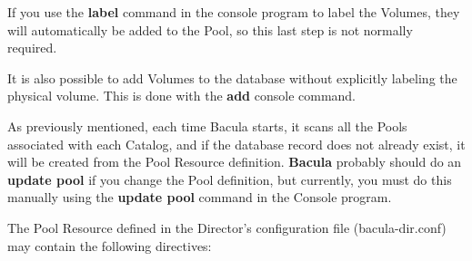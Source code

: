 If you use the {\bf label} command in the console program to label the
Volumes, they will automatically be added to the Pool, so this last step is
not normally required. 

It is also possible to add Volumes to the database without explicitly labeling
the physical volume. This is done with the {\bf add} console command. 

As previously mentioned, each time Bacula starts, it scans all the Pools
associated with each Catalog, and if the database record does not already
exist, it will be created from the Pool Resource definition. {\bf Bacula}
probably should do an {\bf update pool} if you change the Pool definition, but
currently, you must do this manually using the {\bf update pool} command in
the Console program. 

The Pool Resource defined in the Director's configuration file
(bacula-dir.conf) may contain the following directives: 

